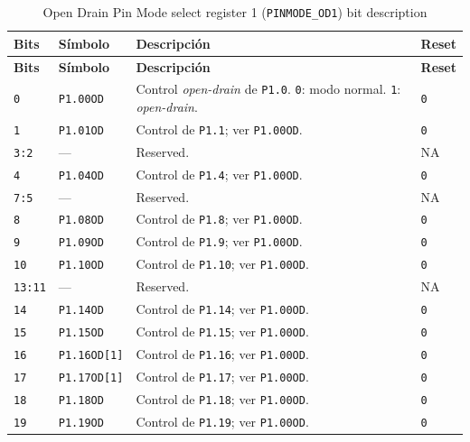 \begin{longtable}{|>{\raggedright\arraybackslash}p{}|>{\raggedright\arraybackslash}p{}|>{\raggedright\arraybackslash}p{}|>{\centering\arraybackslash}p{}|}
\caption{Open Drain Pin Mode select register 1 (\texttt{PINMODE\_OD1}) bit description}\\
\hline
\textbf{Bits} & \textbf{Símbolo} & \textbf{Descripción} & \textbf{Reset} \\
\hline
\endfirsthead
\hline
\textbf{Bits} & \textbf{Símbolo} & \textbf{Descripción} & \textbf{Reset} \\
\hline
\endhead
\texttt{0} & \texttt{P1.00OD} & Control \textit{open-drain} de \texttt{P1.0}. \texttt{0}: modo normal. \texttt{1}: \textit{open-drain}. & \texttt{0} \\
\hline
\texttt{1} & \texttt{P1.01OD} & Control de \texttt{P1.1}; ver \texttt{P1.00OD}. & \texttt{0} \\
\hline
\texttt{3:2} & --- & Reserved. & NA \\
\hline
\texttt{4} & \texttt{P1.04OD} & Control de \texttt{P1.4}; ver \texttt{P1.00OD}. & \texttt{0} \\
\hline
\texttt{7:5} & --- & Reserved. & NA \\
\hline
\texttt{8} & \texttt{P1.08OD} & Control de \texttt{P1.8}; ver \texttt{P1.00OD}. & \texttt{0} \\
\hline
\texttt{9} & \texttt{P1.09OD} & Control de \texttt{P1.9}; ver \texttt{P1.00OD}. & \texttt{0} \\
\hline
\texttt{10} & \texttt{P1.10OD} & Control de \texttt{P1.10}; ver \texttt{P1.00OD}. & \texttt{0} \\
\hline
\texttt{13:11} & --- & Reserved. & NA \\
\hline
\texttt{14} & \texttt{P1.14OD} & Control de \texttt{P1.14}; ver \texttt{P1.00OD}. & \texttt{0} \\
\hline
\texttt{15} & \texttt{P1.15OD} & Control de \texttt{P1.15}; ver \texttt{P1.00OD}. & \texttt{0} \\
\hline
\texttt{16} & \texttt{P1.16OD[1]} & Control de \texttt{P1.16}; ver \texttt{P1.00OD}. & \texttt{0} \\
\hline
\texttt{17} & \texttt{P1.17OD[1]} & Control de \texttt{P1.17}; ver \texttt{P1.00OD}. & \texttt{0} \\
\hline
\texttt{18} & \texttt{P1.18OD} & Control de \texttt{P1.18}; ver \texttt{P1.00OD}. & \texttt{0} \\
\hline
\texttt{19} & \texttt{P1.19OD} & Control de \texttt{P1.19}; ver \texttt{P1.00OD}. & \texttt{0} \\

\end{longtable}

